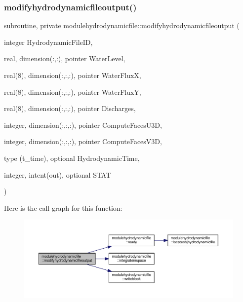 \subsubsection{\texorpdfstring{modifyhydrodynamicfileoutput()}{modifyhydrodynamicfileoutput()}}
{\footnotesize\ttfamily subroutine, private modulehydrodynamicfile\+::modifyhydrodynamicfileoutput (\begin{DoxyParamCaption}\item[{integer}]{Hydrodynamic\+File\+ID,  }\item[{real, dimension(\+:,\+:), pointer}]{Water\+Level,  }\item[{real(8), dimension(\+:,\+:,\+:), pointer}]{Water\+FluxX,  }\item[{real(8), dimension(\+:,\+:,\+:), pointer}]{Water\+FluxY,  }\item[{real(8), dimension(\+:,\+:,\+:), pointer}]{Discharges,  }\item[{integer, dimension(\+:,\+:,\+:), pointer}]{Compute\+Faces\+U3D,  }\item[{integer, dimension(\+:,\+:,\+:), pointer}]{Compute\+Faces\+V3D,  }\item[{type (t\+\_\+time), optional}]{Hydrodynamic\+Time,  }\item[{integer, intent(out), optional}]{S\+T\+AT }\end{DoxyParamCaption})\hspace{0.3cm}{\ttfamily [private]}}

Here is the call graph for this function\+:\nopagebreak
\begin{figure}[H]
\begin{center}
\leavevmode
\includegraphics[width=350pt]{namespacemodulehydrodynamicfile_ab3996472f919cd0d5d57190aa0fca63e_cgraph}
\end{center}
\end{figure}
\mbox{\label{namespacemodulehydrodynamicfile_aa54587d42d6b13c11895a1f934511d94}} 
